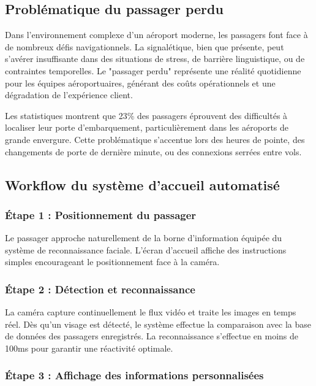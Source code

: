 \documentclass[12pt,a4paper]{article}
\begin{document}
\subsection{Problématique du passager perdu}

Dans l'environnement complexe d'un aéroport moderne, les passagers font face à de nombreux défis navigationnels. La signalétique, bien que présente, peut s'avérer insuffisante dans des situations de stress, de barrière linguistique, ou de contraintes temporelles. Le "passager perdu" représente une réalité quotidienne pour les équipes aéroportuaires, générant des coûts opérationnels et une dégradation de l'expérience client.

Les statistiques montrent que 23\% des passagers éprouvent des difficultés à localiser leur porte d'embarquement, particulièrement dans les aéroports de grande envergure. Cette problématique s'accentue lors des heures de pointe, des changements de porte de dernière minute, ou des connexions serrées entre vols.

\subsection{Workflow du système d'accueil automatisé}

\subsubsection{Étape 1 : Positionnement du passager}

Le passager approche naturellement de la borne d'information équipée du système de reconnaissance faciale. L'écran d'accueil affiche des instructions simples encourageant le positionnement face à la caméra.

\subsubsection{Étape 2 : Détection et reconnaissance}

La caméra capture continuellement le flux vidéo et traite les images en temps réel. Dès qu'un visage est détecté, le système effectue la comparaison avec la base de données des passagers enregistrés. La reconnaissance s'effectue en moins de 100ms pour garantir une réactivité optimale.

\subsubsection{Étape 3 : Affichage des informations personnalisées}
\end{document}
